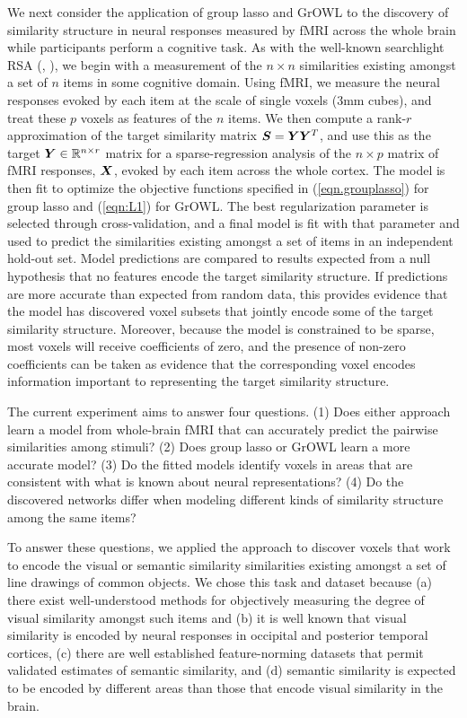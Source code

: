 We next consider the application of group lasso and GrOWL to the discovery of similarity
structure in neural responses measured by fMRI across the whole brain while participants
perform a cognitive task. As with the well-known searchlight RSA (\cite{RSA},
\cite{similarity}), we begin with a measurement of the $n \times n $ similarities existing
amongst a set of $n$ items in some cognitive domain. Using fMRI, we measure the neural
responses evoked by each item at the scale of single voxels (3mm cubes), and treat these
$p$ voxels as features of the $n$ items. We then compute a rank-$r$ approximation of the
target similarity matrix $\boldsymbol{S} = \boldsymbol{Y} \boldsymbol{Y}^T$, and use this as the target $\boldsymbol{Y} \in {\mathbb R}^{n
  \times r} $ matrix for a sparse-regression analysis of the $n \times p$ matrix of fMRI
responses, $\boldsymbol{X}$, evoked by each item across the whole cortex. The model is then fit to
optimize the objective functions specified in (\ref{eqn.grouplasso}) for group lasso and
(\ref{eqn:L1}) for GrOWL. The best regularization parameter is selected through
cross-validation, and a final model is fit with that parameter and used to predict the
similarities existing amongst a set of items in an independent hold-out set. Model
predictions are compared to results expected from a null hypothesis that no features
encode the target similarity structure. If predictions are more accurate than expected
from random data, this provides evidence that the model has discovered voxel subsets that
jointly encode some of the target similarity structure. Moreover, because the model is
constrained to be sparse, most voxels will receive coefficients of zero, and the presence
of non-zero coefficients can be taken as evidence that the corresponding voxel encodes
information important to representing the target similarity structure.

The current experiment aims to answer four questions. (1) Does either approach learn a
model from whole-brain fMRI that can accurately predict the pairwise similarities among
stimuli? (2) Does group lasso or GrOWL learn a more accurate model? (3) Do the fitted
models identify voxels in areas that are consistent with what is known about neural
representations? (4) Do the discovered networks differ when modeling different kinds of
similarity structure among the same items?

To answer these questions, we applied the approach to discover voxels that work to encode
the visual or semantic similarity similarities existing amongst a set of line drawings of
common objects. We chose this task and dataset because (a) there exist well-understood
methods for objectively measuring the degree of visual similarity amongst such items
\cite{antani02} and (b) it is well known that visual similarity is encoded by neural
responses in occipital and posterior temporal cortices, (c) there are well established
feature-norming datasets that permit validated estimates of semantic similarity, and (d)
semantic similarity is expected to be encoded by different areas than those that encode visual similarity in the brain.


